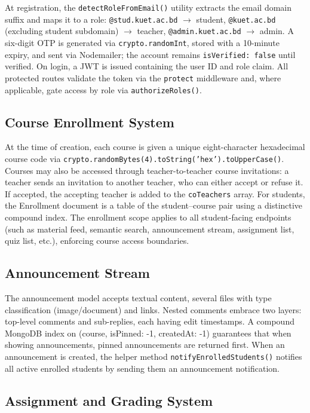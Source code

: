\documentclass[12pt,a4paper]{report}
\begin{document}
At registration, the \texttt{detectRoleFromEmail()} utility extracts the email domain suffix and maps it to a role: \texttt{@stud.kuet.ac.bd} $\rightarrow$ student, \texttt{@kuet.ac.bd} (excluding student subdomain) $\rightarrow$ teacher, \texttt{@admin.kuet.ac.bd} $\rightarrow$ admin. A six-digit OTP is generated via \texttt{crypto.randomInt}, stored with a 10-minute expiry, and sent via Nodemailer; the account remains \texttt{isVerified: false} until verified. On login, a JWT is issued containing the user ID and role claim. All protected routes validate the token via the \texttt{protect} middleware and, where applicable, gate access by role via \texttt{authorizeRoles()}.

\subsection{Course Enrollment System}

At the time of creation, each course is given a unique eight-character hexadecimal course code via \texttt{crypto.randomBytes(4).toString('hex').toUpperCase()}. Courses may also be accessed through teacher-to-teacher course invitations: a teacher sends an invitation to another teacher, who can either accept or refuse it. If accepted, the accepting teacher is added to the \texttt{coTeachers} array. For students, the Enrollment document is a table of the student--course pair using a distinctive compound index. The enrollment scope applies to all student-facing endpoints (such as material feed, semantic search, announcement stream, assignment list, quiz list, etc.), enforcing course access boundaries.

\subsection{Announcement Stream}

The announcement model accepts textual content, several files with type classification (image/document) and links. Nested comments embrace two layers: top-level comments and sub-replies, each having edit timestamps. A compound MongoDB index on (course, isPinned: -1, createdAt: -1) guarantees that when showing announcements, pinned announcements are returned first. When an announcement is created, the helper method \texttt{notifyEnrolledStudents()} notifies all active enrolled students by sending them an announcement notification.

\subsection{Assignment and Grading System}
\end{document}
